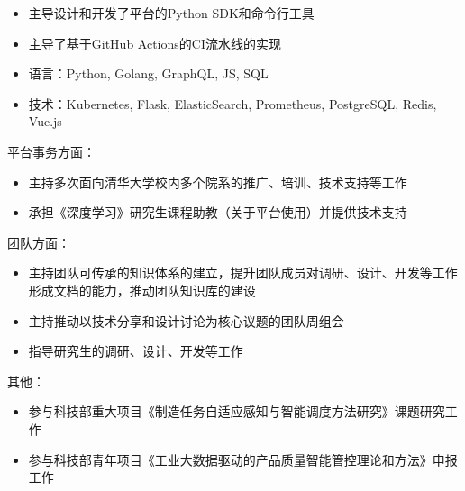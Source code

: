 \documentclass[letterpaper]{twentysecondcv} %
\begin{document}
\begin{twentyfluid}
{{\begin{itemize}
        \item 主导设计和开发了平台的Python SDK和命令行工具
        \item 主导了基于GitHub Actions的CI流水线的实现
        \item 语言：Python, Golang, GraphQL, JS, SQL
        \item 技术：Kubernetes, Flask, ElasticSearch, Prometheus, PostgreSQL, Redis, Vue.js
    \end{itemize}
    平台事务方面：
    \vspace{-0.1cm}
    \begin{itemize}
        \item 主持多次面向清华大学校内多个院系的推广、培训、技术支持等工作
        \item 承担《深度学习》研究生课程助教（关于平台使用）并提供技术支持
    \end{itemize}
    团队方面：
    \vspace{-0.1cm}
    \begin{itemize}
        \item 主持团队可传承的知识体系的建立，提升团队成员对调研、设计、开发等工作形成文档的能力，推动团队知识库的建设
        \item 主持推动以技术分享和设计讨论为核心议题的团队周组会
        \item 指导研究生的调研、设计、开发等工作
    \end{itemize}
    其他：
    \vspace{-0.1cm}
    \begin{itemize}
        \item 参与科技部重大项目《制造任务自适应感知与智能调度方法研究》课题研究工作
        \item 参与科技部青年项目《工业大数据驱动的产品质量智能管控理论和方法》申报工作
    \end{itemize}
    }
    }
\end{twentyfluid}

\vspace{-0.2cm}
\end{document}
